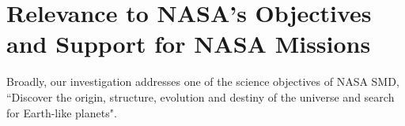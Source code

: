 \documentclass[12pt]{article}
\def\hrs{HET/HRS}
\begin{document}
\begin{comment}
\begin{wrapfigure}{r}{0.51\textwidth}
  \vspace{-35pt}
  \begin{center}
    \texttt{[image: 37605]}
  \end{center}
  \vspace{-25pt}  
  \caption{Best Keplerian fit for the HD 37605 system (top panel:
    solid line) and the velocity residuals (bottom panel). We
    discovered HD 37605$c$ using \hrs\ data spanning $\sim$8 years
    (black dots) and also RVs from Keck and McDonald Observatory 2.1m
    telescope, but only \hrs\ data are shown here to highlight its
    precision and time baseline \citep{wang2012}. The bottom panel
    shows that the amplitude of the RV residuals decreased after the
    fine temperature control for the spectrograph room came online
    (epoch marked by dash-dotted line). The heights of the two grey
    regions are the RMS values before and after (9 and 6 m/s,
    respectively).}
  \vspace{-8pt}  
  \label{fit}
\end{wrapfigure}
\end{comment}


 
\vspace{-3pt}
\section{Relevance to NASA's Objectives and Support for NASA Missions}

Broadly, our investigation addresses one of the science
objectives of NASA SMD, ``Discover the origin, structure, evolution
and destiny of the universe and search for Earth-like planets".
\end{document}
